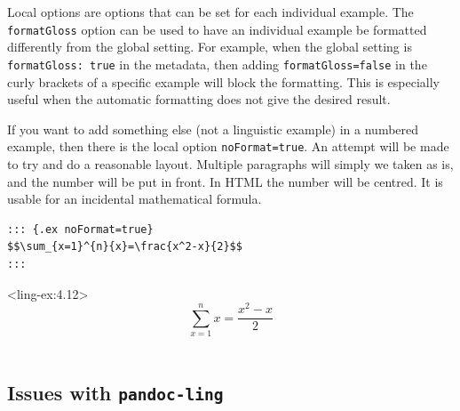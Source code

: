 \documentclass[
]{article}
\begin{document}
Local options are options that can be set for each individual example.
The \texttt{formatGloss} option can be used to have an individual
example be formatted differently from the global setting. For example,
when the global setting is \texttt{formatGloss:\ true} in the metadata,
then adding \texttt{formatGloss=false} in the curly brackets of a
specific example will block the formatting. This is especially useful
when the automatic formatting does not give the desired result.

If you want to add something else (not a linguistic example) in a
numbered example, then there is the local option \texttt{noFormat=true}.
An attempt will be made to try and do a reasonable layout. Multiple
paragraphs will simply we taken as is, and the number will be put in
front. In HTML the number will be centred. It is usable for an
incidental mathematical formula.

\begin{verbatim}
::: {.ex noFormat=true}
$$\sum_{x=1}^{n}{x}=\frac{x^2-x}{2}$$
:::
\end{verbatim}

\ex<ling-ex:4.12> 
  \[\sum_{x=1}^{n}{x}=\frac{x^2-x}{2}\]\\
  
\xe

\hypertarget{issues-with-pandoc-ling}{%
\subsection{\texorpdfstring{Issues with
\texttt{pandoc-ling}}{Issues with pandoc-ling}}\label{issues-with-pandoc-ling}}
\end{document}
